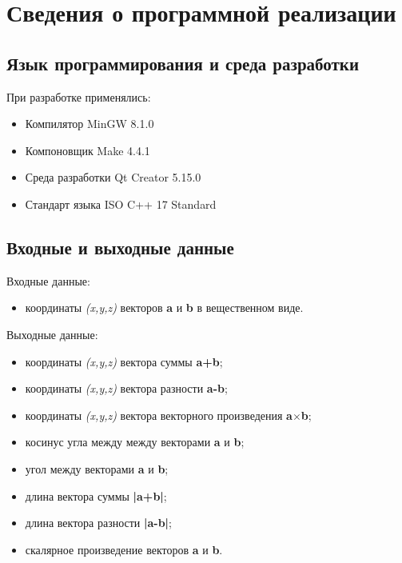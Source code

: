\label{sec:info}
\section{Сведения о программной реализации}

\label{subsec:coding_env}
\subsection{Язык программирования и среда разработки}

При разработке применялись:
\begin{itemize}
    \item Компилятор MinGW 8.1.0
    \item Компоновщик Make 4.4.1
    \item Среда разработки Qt Creator 5.15.0
    \item Стандарт языка ISO C++ 17 Standard
\end{itemize}


\label{subsec:input_output}
\subsection{Входные и выходные данные}

Входные данные:
\begin{itemize}
    \item координаты \textit{(x,y,z)} векторов \textbf{a} и \textbf{b} в вещественном виде.
\end{itemize}

Выходные данные:
\begin{itemize}
    \item координаты \textit{(x,y,z)} вектора суммы \textbf{a+b};
    \item координаты \textit{(x,y,z)} вектора разности \textbf{a-b};
    \item координаты \textit{(x,y,z)} вектора векторного произведения \textbf{a$\times$b};
    \item косинус угла между между векторами \textbf{a} и \textbf{b};
    \item угол между векторами \textbf{a} и \textbf{b};
    \item длина вектора суммы \textbf{|a+b|};
    \item длина вектора разности \textbf{|a-b|};
    \item скалярное произведение векторов \textbf{a} и \textbf{b}.
\end{itemize}


